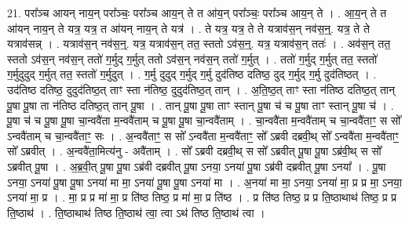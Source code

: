 \documentclass[17pt]{extarticle}
\begin{document}
21. परा᳚ञ्च आयन् नाय॒न् परा᳚ञ्चः॒ परा᳚ञ्च आय॒न् ते त आ॑य॒न् परा᳚ञ्चः॒ परा᳚ञ्च आय॒न् ते । . आ॒य॒न् ते त आ॑यन् नाय॒न् ते यत्र॒ यत्र॒ त आ॑यन् नाय॒न् ते यत्र॑ । . ते यत्र॒ यत्र॒ ते ते यत्राव॑स॒न् नव॑स॒न्॒. यत्र॒ ते ते यत्राव॑सन्न् । . यत्राव॑स॒न् नव॑स॒न्॒. यत्र॒ यत्राव॑स॒न् तत॒ स्ततो ऽव॑स॒न्॒. यत्र॒ यत्राव॑स॒न् ततः॑ । . अव॑स॒न् तत॒ स्ततो ऽव॑स॒न् नव॑स॒न् ततो॑ ग॒र्मुद् ग॒र्मुत् ततो ऽव॑स॒न् नव॑स॒न् ततो॑ ग॒र्मुत् । . ततो॑ ग॒र्मुद् ग॒र्मुत् तत॒ स्ततो॑ ग॒र्मुदुदुद् ग॒र्मुत् तत॒ स्ततो॑ ग॒र्मुदुत् । . ग॒र्मु दुदुद् ग॒र्मुद् ग॒र्मु दुद॑तिष्ठ दतिष्ठ॒ दुद् ग॒र्मुद् ग॒र्मु दुद॑तिष्ठत् । . उद॑तिष्ठ दतिष्ठ॒ दुदुद॑तिष्ठ॒त् ताꣳ स्ता न॑तिष्ठ॒ दुदुद॑तिष्ठ॒त् तान् । . अ॒ति॒ष्ठ॒त् ताꣳ स्ता न॑तिष्ठ दतिष्ठ॒त् तान् पू॒षा पू॒षा ता न॑तिष्ठ दतिष्ठ॒त् तान् पू॒षा । . तान् पू॒षा पू॒षा ताꣳ स्तान् पू॒षा च॑ च पू॒षा ताꣳ स्तान् पू॒षा च॑ । . पू॒षा च॑ च पू॒षा पू॒षा चा॒न्ववै॑ता म॒न्ववै॑ताम् च पू॒षा पू॒षा चा॒न्ववै॑ताम् । . चा॒न्ववै॑ता म॒न्ववै॑ताम् च चा॒न्ववै॑ताꣳ॒॒ स सो᳚ ऽन्ववै॑ताम् च चा॒न्ववै॑ताꣳ॒॒ सः । . अ॒न्ववै॑ताꣳ॒॒ स सो᳚ ऽन्ववै॑ता म॒न्ववै॑ताꣳ॒॒ सो᳚ ऽब्रवी दब्रवी॒थ् सो᳚ ऽन्ववै॑ता म॒न्ववै॑ताꣳ॒॒ सो᳚ ऽब्रवीत् । . अ॒न्ववै॑ता॒मित्य॑नु - अवै॑ताम् । . सो᳚ ऽब्रवी दब्रवी॒थ् स सो᳚ ऽब्रवीत् पू॒षा पू॒षा ऽब्र॑वी॒थ् स सो᳚ ऽब्रवीत् पू॒षा । . अ॒ब्र॒वी॒त् पू॒षा पू॒षा ऽब्र॑वी दब्रवीत् पू॒षा ऽनया॒ ऽनया॑ पू॒षा ऽब्र॑वी दब्रवीत् पू॒षा ऽनया᳚ । . पू॒षा ऽनया॒ ऽनया॑ पू॒षा पू॒षा ऽनया॑ मा मा॒ ऽनया॑ पू॒षा पू॒षा ऽनया॑ मा । . अ॒नया॑ मा मा॒ ऽनया॒ ऽनया॑ मा॒ प्र प्र मा॒ ऽनया॒ ऽनया॑ मा॒ प्र । . मा॒ प्र प्र मा॑ मा॒ प्र ति॑ष्ठ तिष्ठ॒ प्र मा॑ मा॒ प्र ति॑ष्ठ । . प्र ति॑ष्ठ तिष्ठ॒ प्र प्र ति॒ष्ठाथाथ॑ तिष्ठ॒ प्र प्र ति॒ष्ठाथ॑ । . ति॒ष्ठाथाथ॑ तिष्ठ ति॒ष्ठाथ॑ त्वा॒ त्वा ऽथ॑ तिष्ठ ति॒ष्ठाथ॑ त्वा । \newline
\end{document}
